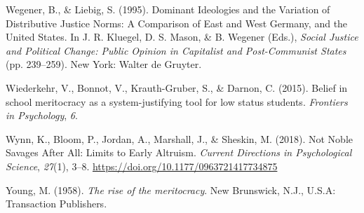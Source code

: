 \documentclass[
  letterpaper,
  DIV=11,
  numbers=noendperiod]{scrartcl}
\newlength{\cslhangindent}
\newlength{\cslentryspacingunit} %
\newenvironment{CSLReferences}[2] %
 {%
  \setlength{\parindent}{0pt}
  \ifodd #1
  \let\oldpar\par
  \def\par{\hangindent=\cslhangindent\oldpar}
  \fi
  \setlength{\parskip}{#2\cslentryspacingunit}
 }%
 {}
\begin{document}
\begin{CSLReferences}{1}{0}
\leavevmode{}%
Wegener, B., \& Liebig, S. (1995). Dominant {Ideologies} and the
{Variation} of {Distributive Justice Norms}: {A Comparison} of {East}
and {West Germany}, and the {United States}. In J. R. Kluegel, D. S.
Mason, \& B. Wegener (Eds.), \emph{Social {Justice} and {Political
Change}: {Public Opinion} in {Capitalist} and {Post-Communist States}}
(pp. 239--259). New York: Walter de Gruyter.

\leavevmode{}%
Wiederkehr, V., Bonnot, V., Krauth-Gruber, S., \& Darnon, C. (2015).
Belief in school meritocracy as a system-justifying tool for low status
students. \emph{Frontiers in Psychology}, \emph{6}.

\leavevmode{}%
Wynn, K., Bloom, P., Jordan, A., Marshall, J., \& Sheskin, M. (2018).
Not {Noble Savages After All}: {Limits} to {Early Altruism}.
\emph{Current Directions in Psychological Science}, \emph{27}(1), 3--8.
\url{https://doi.org/10.1177/0963721417734875}

\leavevmode{}%
Young, M. (1958). \emph{The rise of the meritocracy}. New Brunswick,
N.J., U.S.A: Transaction Publishers.

\end{CSLReferences}
\end{document}
